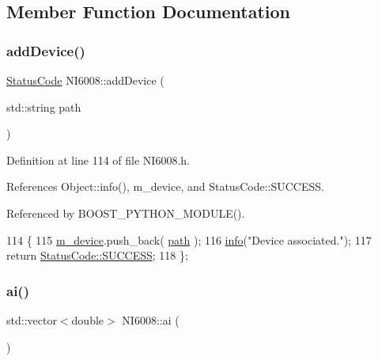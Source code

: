 \subsection{Member Function Documentation}
\mbox{\label{classNI6008_aa1964d9926c122e67a6c8dc570b249ff}} 
\subsubsection{\texorpdfstring{add\+Device()}{addDevice()}}
{\footnotesize\ttfamily \hyperlink{classStatusCode}{Status\+Code} N\+I6008\+::add\+Device (\begin{DoxyParamCaption}\item[{std\+::string}]{path }\end{DoxyParamCaption})\hspace{0.3cm}{\ttfamily [inline]}}



Definition at line 114 of file N\+I6008.\+h.



References Object\+::info(), m\+\_\+device, and Status\+Code\+::\+S\+U\+C\+C\+E\+SS.



Referenced by B\+O\+O\+S\+T\+\_\+\+P\+Y\+T\+H\+O\+N\+\_\+\+M\+O\+D\+U\+L\+E().


\begin{DoxyCode}
114                                        \{
115     \hyperlink{classNI6008_ac7225d517d42b1b7553dc75dccb29b58}{m\_device}.push\_back( \hyperlink{classHierarchy_aa7990fa7caf132d83e361ce033c6c65a}{path} );
116     \hyperlink{classObject_a644fd329ea4cb85f54fa6846484b84a8}{info}(\textcolor{stringliteral}{"Device associated."});
117     \textcolor{keywordflow}{return} \hyperlink{classStatusCode_a6f565cbeadc76d14c72f047e5e85eb4badd0da38d3ba0d922efd1f4619bc37ad8}{StatusCode::SUCCESS};
118   \};
\end{DoxyCode}
\mbox{\label{classNI6008_a0a4ea75184069707de9f0e76f370582e}} 
\subsubsection{\texorpdfstring{ai()}{ai()}}
{\footnotesize\ttfamily std\+::vector$<$double$>$ N\+I6008\+::ai (\begin{DoxyParamCaption}{ }\end{DoxyParamCaption})}



